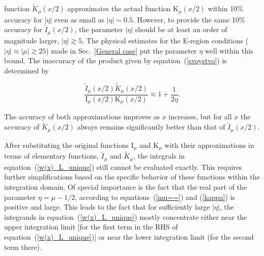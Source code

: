 \documentclass[draft]{agujournal2019}
\begin{document}
{function $\tilde{K}_{\mu}(x/2)  $ approximates the actual
function $\mathrm{K}_{\mu}(x/2)  $ within 10\% accuracy
for $\left\vert \eta\right\vert $ even as small as $|\eta| \sim0.5$. However, to provide the same 10\% accuracy for
$\tilde{I}_{\mu}(x/2)  $, the parameter $|\eta|$ should be at least an order of 
magnitude larger, $|\eta| \gtrsim5$. The physical estimates for the E-region
conditions ($|\eta| \approx|\mu|\gtrsim25$) made in Sec.~\ref{General case} 
put the parameter $\eta$ well within this bound. The inaccuracy of
the product given by equation~(\ref{svoystvo}) is determined by
\begin{linenomath*}
\begin{equation}
\frac{\tilde{I}_{\mu}(x/2)  \tilde{K}_{\mu}(x/2)}{\mathrm{I}_{\mu}(x/2)
\mathrm{K}_{\mu}(x/2)}\approx1+\frac{1}{2\eta}.
\label{product_inaccuracy}
\end{equation}
\end{linenomath*}
The accuracy of both approximations improves as $x$ increases, but
for all $x$ the accuracy of $\tilde{K}_{\mu}(x/2)$ always
remains significantly better than that of $\tilde{I}_{\mu}(x/2)$.

After substituting the original functions $\mathrm{I}_{\mu}$ and
$\mathrm{K}_{\mu}$ with their approximations in terms of elementary functions,
$\tilde{I}_{\mu}$ and $\tilde{K}_{\mu}$, the integrals in
equation~(\ref{w(x)_L_unique}) still cannot be evaluated exactly. This
requires further simplifications based on the specific behavior of these
functions within the integration domain. Of special importance is the fact that
the real part of the parameter $\eta=\mu-1/2$, according to
equations~(\ref{mu==}) and (\ref{kappa}) is positive and large. This leads to the fact
that for sufficiently large $|\eta|$, the integrands in
equation~(\ref{w(x)_L_unique}) mostly concentrate either near the upper
integration limit [for the first term in the RHS of
equation~(\ref{w(x)_L_unique})] or near the lower integration limit (for the
second term there).

}
\end{document}
